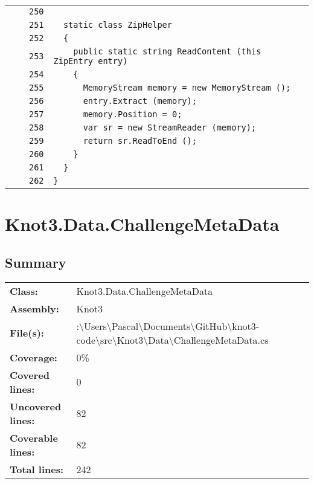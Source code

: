 \documentclass[a4paper,10pt]{article}
\begin{document}
\begin{longtable}[l]{lrrl}
\cellcolor{gray} &  & \verb~250~ & \verb~~\\
\cellcolor{gray} &  & \verb~251~ & \verb~  static class ZipHelper~\\
\cellcolor{gray} &  & \verb~252~ & \verb~  {~\\
\cellcolor{gray} &  & \verb~253~ & \verb~    public static string ReadContent (this ZipEntry entry)~\\
\cellcolor{gray} &  & \verb~254~ & \verb~    {~\\
\cellcolor{gray} &  & \verb~255~ & \verb~      MemoryStream memory = new MemoryStream ();~\\
\cellcolor{gray} &  & \verb~256~ & \verb~      entry.Extract (memory);~\\
\cellcolor{gray} &  & \verb~257~ & \verb~      memory.Position = 0;~\\
\cellcolor{gray} &  & \verb~258~ & \verb~      var sr = new StreamReader (memory);~\\
\cellcolor{gray} &  & \verb~259~ & \verb~      return sr.ReadToEnd ();~\\
\cellcolor{gray} &  & \verb~260~ & \verb~    }~\\
\cellcolor{gray} &  & \verb~261~ & \verb~  }~\\
\cellcolor{gray} &  & \verb~262~ & \verb~}~\\
\end{longtable}
\newpage
\section{Knot3.Data.ChallengeMetaData}
\subsection{Summary}
\begin{longtable}[l]{ll}
\textbf{Class:} & Knot3.Data.ChallengeMetaData\\
\textbf{Assembly:} & Knot3\\
\textbf{File(s):} & \begin{minipage}[t]{12cm}{:\textbackslash Users\textbackslash Pascal\textbackslash Documents\textbackslash GitHub\textbackslash knot3-code\textbackslash src\textbackslash Knot3\textbackslash Data\textbackslash ChallengeMetaData.cs}\end{minipage} \\
\textbf{Coverage:} & 0\%\\
\textbf{Covered lines:} & 0\\
\textbf{Uncovered lines:} & 82\\
\textbf{Coverable lines:} & 82\\
\textbf{Total lines:} & 242\\
\end{longtable}
\end{document}
